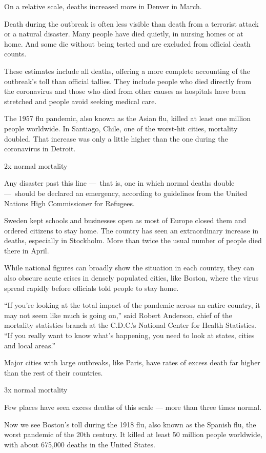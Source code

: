 On a relative scale, deaths increased more in Denver in March.

Death during the outbreak is often less visible than death from a
terrorist attack or a natural disaster. Many people have died quietly,
in nursing homes or at home. And some die without being tested and are
excluded from official death counts.

These estimates include all deaths, offering a more complete accounting
of the outbreak's toll than official tallies. They include people who
died directly from the coronavirus and those who died from other causes
as hospitals have been stretched and people avoid seeking medical care.

The 1957 flu pandemic, also known as the Asian flu, killed at least one
million people worldwide. In Santiago, Chile, one of the worst-hit
cities, mortality doubled. That increase was only a little higher than
the one during the coronavirus in Detroit.

2x normal mortality

Any disaster past this line ---~that is, one in which normal deaths
double ---~should be declared an emergency, according to guidelines from
the United Nations High Commissioner for Refugees.

Sweden kept schools and businesses open as most of Europe closed them
and ordered citizens to stay home. The country has seen an extraordinary
increase in deaths, especially in Stockholm. More than twice the usual
number of people died there in April.

While national figures can broadly show the situation in each country,
they can also obscure acute crises in densely populated cities, like
Boston, where the virus spread rapidly before officials told people to
stay home.

``If you're looking at the total impact of the pandemic across an entire
country, it may not seem like much is going on,'' said Robert Anderson,
chief of the mortality statistics branch at the C.D.C.'s National Center
for Health Statistics. ``If you really want to know what's happening,
you need to look at states, cities and local areas.''

Major cities with large outbreaks, like Paris, have rates of excess
death far higher than the rest of their countries.

3x normal mortality

Few places have seen excess deaths of this scale --- more than three
times normal.

Now we see Boston's toll during the 1918 flu, also known as the Spanish
flu, the worst pandemic of the 20th century. It killed at least 50
million people worldwide, with about 675,000 deaths in the United
States.

